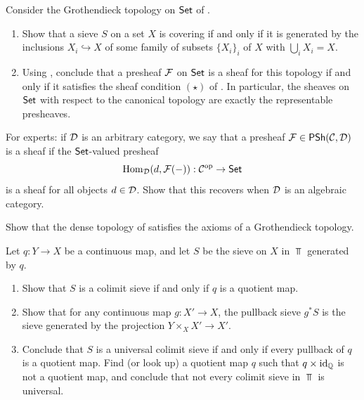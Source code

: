 \begin{exercise}\label{exercise:chap:sheaves:sec:sites:canonical topology on Set via subsets}
    Consider the Grothendieck topology on $\Set$ of .
    \begin{enumerate}[label=(\alph*)]
        \item Show that a sieve $S$ on a set $X$ is covering if and only if it is generated by the inclusions $X_i \hookrightarrow X$ of some family of subsets $\{X_i\}_i$ of $X$ with $\bigcup_i X_i = X$.
        \item Using , conclude that a presheaf $\cal{F}$ on $\Set$ is a sheaf for this topology if and only if it satisfies the sheaf condition $(\star)$ of . In particular, the sheaves on $\Set$ with respect to the canonical topology are exactly the representable presheaves.
    \end{enumerate}
\end{exercise}

\begin{exercise}\label{exercise:chap:sheaves:sec:sites:sheaves valued in an arbitrary category}
    For experts: if $\catD$ is an arbitrary category, we say that a presheaf $\cal{F} \in \PSh(\catC,\catD)$ is a sheaf if the $\Set$-valued presheaf
    \[\Hom_\catD(d,\cal{F}({-})) : \catC^\op \to \Set\]
    is a sheaf for all objects $d \in \catD$. Show that this recovers  when $\catD$ is an algebraic category.
\end{exercise}

\begin{exercise}\label{exercise:chap:sheaves:sec:sites:dense topology is a topology}
    Show that the dense topology of  satisfies the axioms of a Grothendieck topology.
\end{exercise}

\begin{exercise}\label{exercise:chap:sheaves:sec:sites:colimit sieves in Top}
    Let $q : Y \to X$ be a continuous map, and let $S$ be the sieve on $X$ in $\Top$ generated by $q$.
    \begin{enumerate}[label=(\alph*)]
        \item Show that $S$ is a colimit sieve if and only if $q$ is a quotient map.
        \item Show that for any continuous map $g : X' \to X$, the pullback sieve $g^* S$ is the sieve generated by the projection $Y \times_X X' \to X'$.
        \item Conclude that $S$ is a universal colimit sieve if and only if every pullback of $q$ is a quotient map. Find (or look up) a quotient map $q$ such that $q \times \id_{\mathbb{Q}}$ is not a quotient map, and conclude that not every colimit sieve in $\Top$ is universal.
    \end{enumerate}
\end{exercise}

